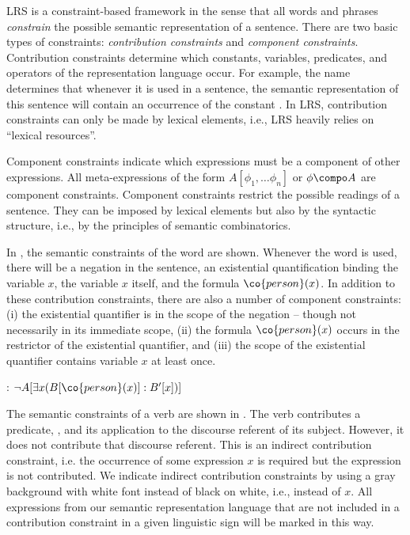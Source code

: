 \documentclass[output=paper]{langsci/langscibook}
\begin{document}
LRS is a constraint-based framework in the sense that all words and phrases \emph{constrain} the possible semantic representation of a sentence. 
There are two basic types of constraints: \emph{contribution constraints} and \emph{component constraints}. 
Contribution constraints determine which constants, variables, predicates, and operators of the representation language occur. 
For example, the name  determines that whenever it is used in a sentence, the semantic representation of this sentence will contain an occurrence of the constant . In LRS, contribution constraints can only be made by lexical elements, i.e., LRS heavily relies on ``lexical resources''.

Component constraints indicate which expressions must be a component of other expressions. All meta-expressions of the form $A[\phi_1, \ldots \phi_n]$ or $\phi \compo A$ are component constraints. 
Component constraints restrict the possible readings of a sentence. They can be imposed by lexical elements but also by the syntactic structure, i.e., by the principles of semantic combinatorics.

In , the semantic constraints of the word  are shown. Whenever the word is used, there will be a negation in the sentence, an existential quantification binding the variable $x$, the variable $x$ itself, and the formula $\co{person}(x)$. In addition to these contribution constraints, there are also a number of component constraints: (i) the existential quantifier is in the scope of the negation -- though not necessarily in its immediate scope, (ii) the formula $\co{person}(x)$ occurs in the restrictor of the existential quantifier, and (iii) the scope of the existential quantifier contains variable $x$ at least once.

\ea \label{le-niemand}
: $\lnot A[\exists x (B[\co{person}(x)] : B'[x])]$
\z

The semantic constraints of a verb are shown in . The verb contributes a predicate, , and its application to the discourse referent of its subject. However, it
does not contribute that discourse referent. This is an indirect contribution constraint, i.e. the occurrence of some expression $x$ is required but the expression is not contributed. 
We indicate indirect contribution constraints 
by using a gray background with white font instead of black on white, i.e.,  instead of $x$.
All expressions from our semantic representation language that are not included in a contribution constraint in a given linguistic sign will be marked in this way.
\end{document}
